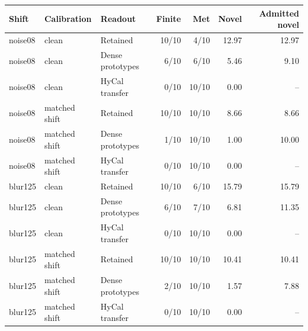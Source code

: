 \begin{tabular}{@{}lllrrrr@{}}
\toprule
Shift & Calibration & Readout & Finite & Met & Novel & Admitted novel \\
\midrule
noise08 & clean & Retained & 10/10 & 4/10 & 12.97 & 12.97 \\
noise08 & clean & Dense prototypes & 6/10 & 6/10 & 5.46 & 9.10 \\
noise08 & clean & HyCal transfer & 0/10 & 10/10 & 0.00 & -- \\
noise08 & matched shift & Retained & 10/10 & 10/10 & 8.66 & 8.66 \\
noise08 & matched shift & Dense prototypes & 1/10 & 10/10 & 1.00 & 10.00 \\
noise08 & matched shift & HyCal transfer & 0/10 & 10/10 & 0.00 & -- \\
blur125 & clean & Retained & 10/10 & 6/10 & 15.79 & 15.79 \\
blur125 & clean & Dense prototypes & 6/10 & 7/10 & 6.81 & 11.35 \\
blur125 & clean & HyCal transfer & 0/10 & 10/10 & 0.00 & -- \\
blur125 & matched shift & Retained & 10/10 & 10/10 & 10.41 & 10.41 \\
blur125 & matched shift & Dense prototypes & 2/10 & 10/10 & 1.57 & 7.88 \\
blur125 & matched shift & HyCal transfer & 0/10 & 10/10 & 0.00 & -- \\
\bottomrule
\end{tabular}
